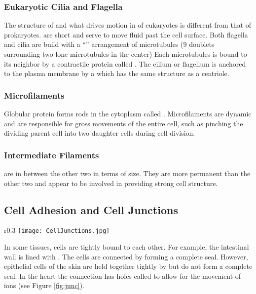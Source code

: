 \documentclass[../Bio_chemistryReview.tex]{subfiles}
\begin{document}
\subsubsection{Eukaryotic Cilia and Flagella}
The structure of and what drives motion in  of eukaryotes is
different from that of prokaryotes.  are short and serve to move
fluid past the cell surface. Both flagella and cilia are build with a
``'' arrangement of microtubules (9 doublets surrounding two lone
microtubules in the center) Each microtubules is bound to its neighbor by a
contractile protein called . The cilium or flagellum is anchored
to the plasma membrane by a  which has the same structure as
a centriole. 

\subsubsection{Microfilaments}
Globular protein  forms rods in the cytoplasm called
. Microfilaments are dynamic and are responsible for
gross movements of the entire cell, such as pinching the dividing parent cell
into two daughter cells during cell division.

\subsubsection{Intermediate Filaments}
 are in between the other two in terms of size.
They are more permanent than the other two and appear to be involved in
providing strong cell structure.

\subsection{Cell Adhesion and Cell Junctions}
\begin{wrapfigure}{r}{0.3\textwidth}
    \centering
    \vspace{-24pt}
    \texttt{[image: CellJunctions.jpg]}
    \caption{Cell Junctions}
    \label{fig:junc}
\end{wrapfigure}
In some tissues, cells are tightly bound to each other. For example, the
intestinal wall is lined with . The cells are connected by
 forming a complete seal. However, epithelial cells of
the skin are held together tightly by  but do not form a
complete seal. In the heart the connection has holes called  to allow for the movement of ions (see Figure \ref{fig:junc}).\par
\end{document}

